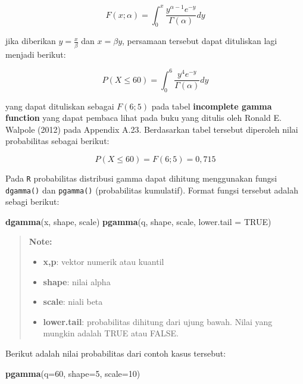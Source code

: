 \documentclass[]{book}
\newenvironment{Shaded}{\begin{snugshade}}{\end{snugshade}}
\newcommand{\KeywordTok}[1]{\textcolor[rgb]{0.13,0.29,0.53}{\textbf{#1}}}
\newcommand{\DataTypeTok}[1]{\textcolor[rgb]{0.13,0.29,0.53}{#1}}
\newcommand{\DecValTok}[1]{\textcolor[rgb]{0.00,0.00,0.81}{#1}}
\newcommand{\OtherTok}[1]{\textcolor[rgb]{0.56,0.35,0.01}{#1}}
\newcommand{\NormalTok}[1]{#1}
\providecommand{\tightlist}{%
  \setlength{\itemsep}{0pt}\setlength{\parskip}{0pt}}
\begin{document}
\[
F\left(x;\alpha\right)=\int_0^x\frac{y^{\alpha-1}e^{-y}}{\Gamma\left(\alpha\right)}dy
\]

jika diberikan \(y=\frac{x}{\beta}\) dan \(x=\beta y\), persamaan
tersebut dapat dituliskan lagi menjadi berikut:

\[
P\left(X\le60\right)=\int_0^6\frac{y^4e^{-y}}{\Gamma\left(\alpha\right)}dy
\]

yang dapat dituliskan sebagai \(F\left(6;5\right)\) pada tabel
\textbf{incomplete gamma function} yang dapat pembaca lihat pada buku
yang ditulis oleh Ronald E. Walpole (2012) pada Appendix A.23.
Berdasarkan tabel tersebut diperoleh nilai probabilitas sebagai berikut:

\[
P\left(X\le60\right)=F\left(6;5\right)=0,715
\]

Pada \texttt{R} probabilitas distribusi gamma dapat dihitung menggunakan
fungsi \texttt{dgamma()} dan \texttt{pgamma()} (probabilitas kumulatif).
Format fungsi tersebut adalah sebagi berikut:

\begin{Shaded}
\begin{Highlighting}[]
\KeywordTok{dgamma}\NormalTok{(x, shape, scale)}
\KeywordTok{pgamma}\NormalTok{(q, shape, scale, }\DataTypeTok{lower.tail =} \OtherTok{TRUE}\NormalTok{)}
\end{Highlighting}
\end{Shaded}

\begin{quote}
\textbf{Note: }

\begin{itemize}
\tightlist
\item
  \textbf{x,p}: vektor numerik atau kuantil
\item
  \textbf{shape}: nilai alpha
\item
  \textbf{scale}: niali beta
\item
  \textbf{lower.tail}: probabilitas dihitung dari ujung bawah. Nilai
  yang mungkin adalah TRUE atau FALSE.
\end{itemize}
\end{quote}

Berikut adalah nilai probabilitas dari contoh kasus tersebut:

\begin{Shaded}
\begin{Highlighting}[]
\KeywordTok{pgamma}\NormalTok{(}\DataTypeTok{q=}\DecValTok{60}\NormalTok{, }\DataTypeTok{shape=}\DecValTok{5}\NormalTok{, }\DataTypeTok{scale=}\DecValTok{10}\NormalTok{)}
\end{Highlighting}
\end{Shaded}
\end{document}
